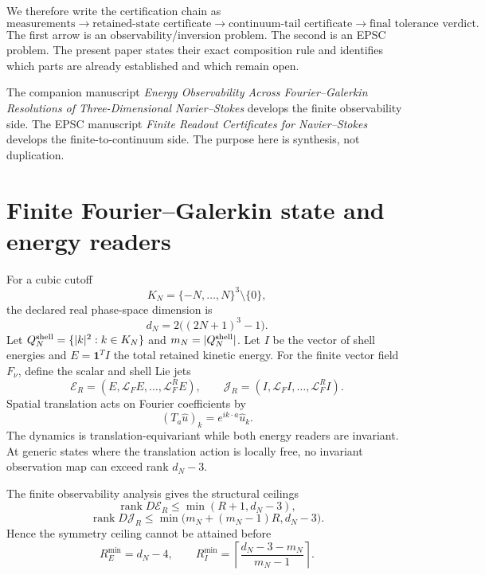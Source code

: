 \documentclass[11pt]{article}
\theoremstyle{definition}
\begin{document}
We therefore write the certification chain as
\[
\boxed{
\text{measurements}
\longrightarrow
\text{retained-state certificate}
\longrightarrow
\text{continuum-tail certificate}
\longrightarrow
\text{final tolerance verdict}.
}
\]
The first arrow is an observability/inversion problem.  The second is an EPSC problem.  The present
paper states their exact composition rule and identifies which parts are already established and
which remain open.

The companion manuscript \emph{Energy Observability Across Fourier--Galerkin Resolutions of
Three-Dimensional Navier--Stokes} develops the finite observability side.  The EPSC manuscript
\emph{Finite Readout Certificates for Navier--Stokes} develops the finite-to-continuum side.  The
purpose here is synthesis, not duplication.

\section{Finite Fourier--Galerkin state and energy readers}

For a cubic cutoff
\[
K_N=\{-N,\ldots,N\}^3\setminus\{0\},
\]
the declared real phase-space dimension is
\begin{equation}\label{eq:dN}
\boxed{d_N=2\big((2N+1)^3-1\big).}
\end{equation}
Let $Q_N^{\rm shell}=\{|k|^2:k\in K_N\}$ and $m_N=|Q_N^{\rm shell}|$.  Let $I$ be the vector of
shell energies and $E=\mathbf 1^T I$ the total retained kinetic energy.  For the finite vector field
$F_\nu$, define the scalar and shell Lie jets
\[
\mathcal E_R=(E,\mathcal L_FE,\ldots,\mathcal L_F^R E),
\qquad
\mathcal J_R=(I,\mathcal L_FI,\ldots,\mathcal L_F^R I).
\]
Spatial translation acts on Fourier coefficients by
\[
(T_a\widehat u)_k=e^{ik\cdot a}\widehat u_k.
\]
The dynamics is translation-equivariant while both energy readers are invariant.  At generic states
where the translation action is locally free, no invariant observation map can exceed rank $d_N-3$.

The finite observability analysis gives the structural ceilings
\begin{equation}\label{eq:scalarceiling}
\boxed{\operatorname{rank}D\mathcal E_R\le\min(R+1,d_N-3),}
\end{equation}
\begin{equation}\label{eq:shellceiling}
\boxed{\operatorname{rank}D\mathcal J_R\le
\min\big(m_N+(m_N-1)R,d_N-3\big).}
\end{equation}
Hence the symmetry ceiling cannot be attained before
\begin{equation}\label{eq:depths}
R_E^{\min}=d_N-4,
\qquad
R_I^{\min}=\left\lceil\frac{d_N-3-m_N}{m_N-1}\right\rceil.
\end{equation}
\end{document}
